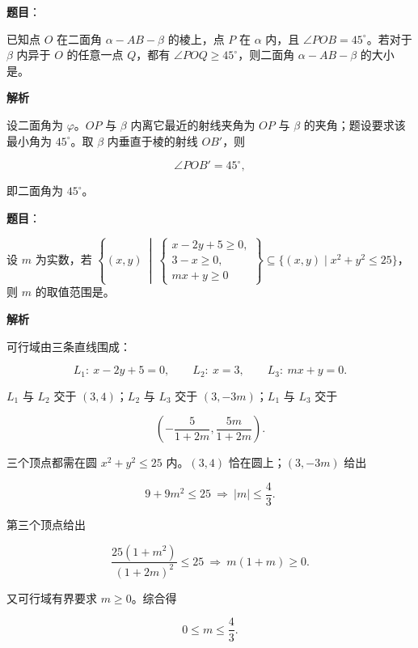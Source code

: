 \begin{answer}

\textbf{题目}：

已知点 $O$ 在二面角 $\alpha-AB-\beta$ 的棱上，点 $P$ 在 $\alpha$ 内，且 $\angle POB=45^\circ$。若对于 $\beta$ 内异于 $O$ 的任意一点 $Q$，都有 $\angle POQ\geqslant45^\circ$，则二面角 $\alpha-AB-\beta$ 的大小是\gkblank{}。

\textbf{解析}

设二面角为 $\varphi$。$OP$ 与 $\beta$ 内离它最近的射线夹角为 $OP$ 与 $\beta$ 的夹角；题设要求该最小角为 $45^\circ$。取 $\beta$ 内垂直于棱的射线 $OB'$，则

\nopagebreak[4]
\[\angle POB'=45^\circ,\]

即二面角为 $45^\circ$。


\end{answer}
\begin{answer}

\textbf{题目}：

设 $m$ 为实数，若 $\left\{(x,y)\ \middle|\ \begin{cases}x-2y+5\geqslant0,\\ 3-x\geqslant0,\\ mx+y\geqslant0\end{cases}\right\}\subseteq\{(x,y)\mid x^2+y^2\leqslant25\}$，则 $m$ 的取值范围是\gkblank{}。

\textbf{解析}

可行域由三条直线围成：

\nopagebreak[4]
\[L_1:\ x-2y+5=0,\qquad L_2:\ x=3,\qquad L_3:\ mx+y=0.\]

$L_1$ 与 $L_2$ 交于 $(3,4)$；$L_2$ 与 $L_3$ 交于 $(3,-3m)$；$L_1$ 与 $L_3$ 交于

\nopagebreak[4]
\[\left(-\frac5{1+2m},\frac{5m}{1+2m}\right).\]

三个顶点都需在圆 $x^2+y^2\leqslant25$ 内。$(3,4)$ 恰在圆上；$(3,-3m)$ 给出

\nopagebreak[4]
\[9+9m^2\leqslant25\ \Rightarrow\ |m|\leqslant\frac43.\]

第三个顶点给出

\nopagebreak[4]
\[\frac{25(1+m^2)}{(1+2m)^2}\leqslant25\ \Rightarrow\ m(1+m)\geqslant0.\]

又可行域有界要求 $m\geqslant0$。综合得

\nopagebreak[4]
\[0\leqslant m\leqslant\frac43.\]


\end{answer}
